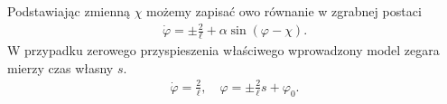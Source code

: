 Podstawiając zmienną $\chi$ możemy zapisać owo równanie w 
zgrabnej postaci
\begin{align}\label{phi_equation}
\boxed{
\dot{\varphi}   = \pm \frac{2}{\ell} +\alpha \sin ( \varphi -\chi ) .
}
\end{align}
W przypadku zerowego przyspieszenia właściwego 
wprowadzony model zegara mierzy czas własny $s$.
\begin{align}
\dot{\varphi} = \frac{2}{\ell},\quad
\varphi =\pm \frac{2}{\ell} s + \varphi_0.
\end{align}
